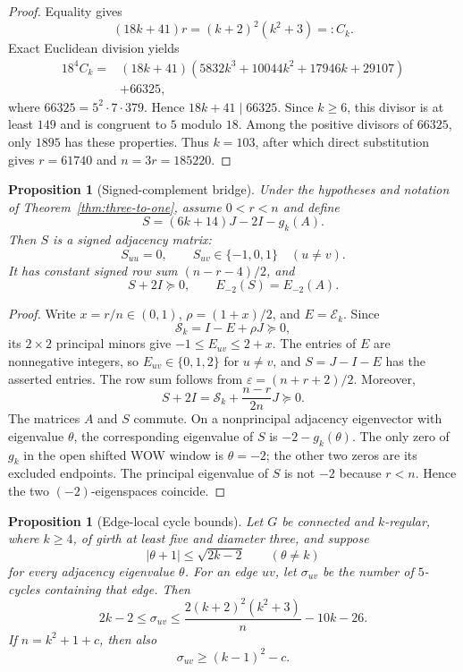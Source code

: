 \documentclass[a4paper,10pt,reqno]{amsart}
\theoremstyle{plain}
\newtheorem{proposition}[theorem]{Proposition}
\theoremstyle{definition}
\theoremstyle{remark}
\begin{document}
\begin{proof}
Equality gives
\[
 (18k+41)r=(k+2)^2(k^2+3)=:C_k.
\]
Exact Euclidean division yields
\[
\begin{aligned}
18^4C_k={}&(18k+41)
 (5832k^3+10044k^2+17946k+29107)\\
&+66325,
\end{aligned}
\]
where \(66325=5^2\cdot7\cdot379\).  Hence \(18k+41\mid66325\).
Since \(k\ge6\), this divisor is at least \(149\) and is congruent to \(5\)
modulo \(18\).  Among the positive divisors of \(66325\), only
\(1895\) has these properties.  Thus \(k=103\), after which direct
substitution gives \(r=61740\) and \(n=3r=185220\).
\end{proof}

\begin{proposition}[Signed-complement bridge]\label{prop:signed-complement}
Under the hypotheses and notation of Theorem~\ref{thm:three-to-one}, assume
\(0<r<n\) and define
\[
 S=(6k+14)J-2I-g_k(A).
\]
Then \(S\) is a signed adjacency matrix:
\[
 S_{uu}=0,\qquad S_{uv}\in\{-1,0,1\}\quad(u\ne v).
\]
It has constant signed row sum \((n-r-4)/2\), and
\[
 S+2I\succeq0,\qquad E_{-2}(S)=E_{-2}(A).
\]
\end{proposition}

\begin{proof}
Write \(x=r/n\in(0,1)\), \(\rho=(1+x)/2\), and
\(E=\mathcal E_k\).  Since
\[
 \mathcal S_k=I-E+\rho J\succeq0,
\]
its \(2\times2\) principal minors give
\(-1\le E_{uv}\le2+x\).  The entries of \(E\) are nonnegative integers, so
\(E_{uv}\in\{0,1,2\}\) for \(u\ne v\), and \(S=J-I-E\) has the asserted
entries.  The row sum follows from
\(\varepsilon=(n+r+2)/2\).  Moreover,
\[
 S+2I
 =\mathcal S_k+\frac{n-r}{2n}J\succeq0.
\]
The matrices \(A\) and \(S\) commute.  On a nonprincipal adjacency
eigenvector with eigenvalue \(\theta\), the corresponding eigenvalue of \(S\)
is \(-2-g_k(\theta)\).  The only zero of \(g_k\) in the open shifted WOW
window is \(\theta=-2\); the other two zeros are its excluded endpoints.
The principal eigenvalue of \(S\) is not \(-2\) because \(r<n\).  Hence the
two \((-2)\)-eigenspaces coincide.
\end{proof}

\begin{proposition}[Edge-local cycle bounds]\label{prop:edge-cycle}
Let \(G\) be connected and \(k\)-regular, where \(k\ge4\), of girth at least
five and diameter
three, and suppose
\[
 |\theta+1|\le\sqrt{2k-2}
 \qquad(\theta\ne k)
\]
for every adjacency eigenvalue \(\theta\).  For an edge \(uv\), let
\(\sigma_{uv}\) be the number of
\(5\)-cycles containing that edge.  Then
\[
 2k-2\le\sigma_{uv}\le
 \frac{2(k+2)^2(k^2+3)}n-10k-26.
\]
If \(n=k^2+1+c\), then also
\[
 \sigma_{uv}\ge(k-1)^2-c.
\]
\end{proposition}
\end{document}

